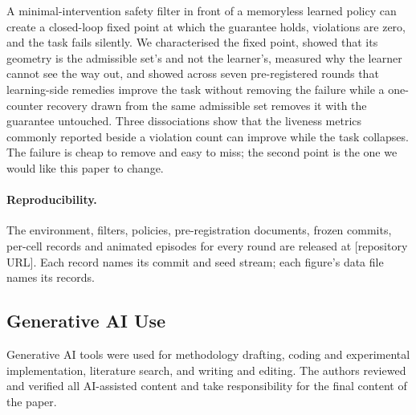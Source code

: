 \documentclass{l4dc2027}
\begin{document}
A minimal-intervention safety filter in front of a memoryless learned policy can create a closed-loop fixed point at which the guarantee holds, violations are zero, and the task fails silently. We characterised the fixed point, showed that its geometry is the admissible set's and not the learner's, measured why the learner cannot see the way out, and showed across seven pre-registered rounds that learning-side remedies improve the task without removing the failure while a one-counter recovery drawn from the same admissible set removes it with the guarantee untouched. Three dissociations show that the liveness metrics commonly reported beside a violation count can improve while the task collapses. The failure is cheap to remove and easy to miss; the second point is the one we would like this paper to change.

\paragraph{Reproducibility.} The environment, filters, policies, pre-registration documents, frozen commits, per-cell records and animated episodes for every round are released at [repository URL]. Each record names its commit and seed stream; each figure's data file names its records.

\subsection*{Generative AI Use}

Generative AI tools were used for methodology drafting, coding and experimental implementation, literature search, and writing and editing. The authors reviewed and verified all AI-assisted content and take responsibility for the final content of the paper.


\end{document}
